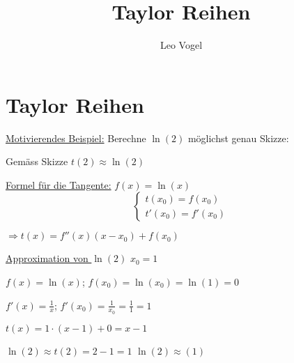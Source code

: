 \documentclass{article}
\title{Taylor Reihen}
\author{Leo Vogel}
\begin{document}
\maketitle
\section*{Taylor Reihen}
\underline{Motivierendes Beispiel:} Berechne \(\ln(2)\) möglichst genau
\newline
Skizze:

Gemäss Skizze \(t(2) \approx \ln(2)\)

\underline{Formel für die Tangente:} \(f(x) = \ln(x)\)
\[
\begin{cases}
    t(x_0) = f(x_0) \\
    t'(x_0) = f'(x_0)
\end{cases}
\]

\(
\Rightarrow t(x) = f''(x)(x - x_0) + f(x_0)
\)

\underline{Approximation von \(\ln(2)\)} \(x_0 = 1\) 

\(f(x)=\ln(x)\); \(f(x_0)=\ln(x_0)=\ln(1)=0\)

\(f'(x) = \frac{1}{x}\); \(f'(x_0)=\frac{1}{x_0}=\frac{1}{1}=1\)

\(
t(x) = 1 \cdot (x-1)+0=x-1
\)

\(
\ln(2) \approx t(2) = 2-1=1
\)
\(
\ln(2) \approx (1) 
\) 
 
\end{document}
